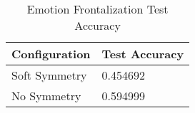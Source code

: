 \begin{table}[H] \centering

\makeatletter
\def\rulecolor#1#{\CT@arc{#1}}
\def\CT@arc#1#2{%
\ifdim\baselineskip=\z@\noalign\fi
{\gdef\CT@arc@{\color#1{#2}}}}
\let\CT@arc@\relax
{}
\makeatother

\begin{tabular}{@{}l|l@{}}
	\toprule
    Configuration & Test Accuracy \\
    
    \midrule
    Soft Symmetry & 0.454692 \\    
    No Symmetry & 0.594999 \\
    
    \bottomrule
\end{tabular}
    
	\caption{Emotion Frontalization Test Accuracy} 
    \label{table:fake-emotion_frontal}

\end{table}